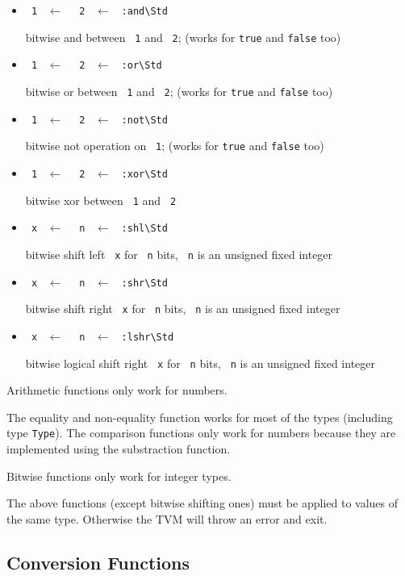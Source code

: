 \documentclass{report}
\newcommand{\mstd}[1]{\texttt{#1\textbackslash Std}}
\newcommand{\mtilde}[1]{\textasciitilde}
\newcommand{\marg}[1]{\texttt{\mtilde ~#1}}
\newcommand{\mla}[0]{~$\leftarrow$ ~}
\newcommand{\arithstd}[1]{\marg{1} \mla \marg{2} \mla \mstd{#1}}
\begin{document}
\begin{itemize}
\item \arithstd{:and}

bitwise and between \marg1 and \marg2; (works for \texttt{true} and \texttt{false} too)
\item \arithstd{:or}

bitwise or between \marg1 and \marg2; (works for \texttt{true} and \texttt{false} too)
\item \arithstd{:not}

bitwise not operation on \marg1; (works for \texttt{true} and \texttt{false} too)
\item \arithstd{:xor}

bitwise xor between \marg1 and \marg2
\item \marg{x} \mla \marg{n} \mla \mstd{:shl}

bitwise shift left \marg{x} for \marg{n} bits, \marg{n} is an unsigned fixed integer
\item \marg{x} \mla \marg{n} \mla \mstd{:shr}

bitwise shift right \marg{x} for \marg{n} bits, \marg{n} is an unsigned fixed integer
\item \marg{x} \mla \marg{n} \mla \mstd{:lshr}

bitwise logical shift right \marg{x} for \marg{n} bits, \marg{n} is an unsigned fixed integer
\end{itemize}

\begin{mdframed}[style=hint]
  Arithmetic functions only work for numbers.

  The equality and non-equality function works for most of the types (including type \texttt{Type}).
  The comparison functions only work for numbers because they are implemented using the substraction function.

  Bitwise functions only work for integer types.
\end{mdframed}

\begin{mdframed}[style=hint]
  The above functions (except bitwise shifting ones) must be applied to values of the same type. Otherwise the TVM will throw an error and exit.
\end{mdframed}

\subsection{Conversion Functions}
\end{document}
